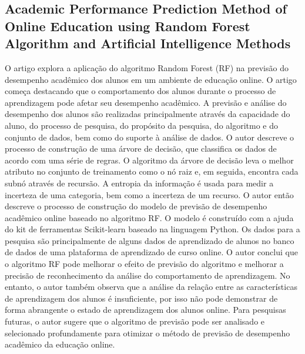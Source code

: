 \documentclass[conference]{IEEEtran}
\begin{document}
\subsection{Academic Performance Prediction Method of Online Education using Random Forest Algorithm and Artificial Intelligence Methods\cite{b9}}
O artigo explora a aplicação do algoritmo Random Forest (RF) na previsão do desempenho acadêmico dos alunos em um ambiente de educação online.
O artigo começa destacando que o comportamento dos alunos durante o processo de aprendizagem pode afetar seu desempenho acadêmico. A previsão e análise do desempenho dos alunos são realizadas principalmente através da capacidade do aluno, do processo de pesquisa, do propósito da pesquisa, do algoritmo e do conjunto de dados, bem como do suporte à análise de dados.
O autor descreve o processo de construção de uma árvore de decisão, que classifica os dados de acordo com uma série de regras. O algoritmo da árvore de decisão leva o melhor atributo no conjunto de treinamento como o nó raiz e, em seguida, encontra cada subnó através de recursão. A entropia da informação é usada para medir a incerteza de uma categoria, bem como a incerteza de um recurso.
O autor então descreve o processo de construção do modelo de previsão de desempenho acadêmico online baseado no algoritmo RF. O modelo é construído com a ajuda do kit de ferramentas Scikit-learn baseado na linguagem Python. Os dados para a pesquisa são principalmente de alguns dados de aprendizado de alunos no banco de dados de uma plataforma de aprendizado de curso online.
O autor conclui que o algoritmo RF pode melhorar o efeito de previsão do algoritmo e melhorar a precisão de reconhecimento da análise do comportamento de aprendizagem. No entanto, o autor também observa que a análise da relação entre as características de aprendizagem dos alunos é insuficiente, por isso não pode demonstrar de forma abrangente o estado de aprendizagem dos alunos online. Para pesquisas futuras, o autor sugere que o algoritmo de previsão pode ser analisado e selecionado profundamente para otimizar o método de previsão de desempenho acadêmico da educação online.
\end{document}
